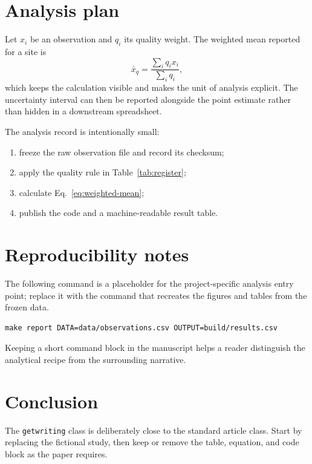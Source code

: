 \documentclass{getwriting}
\begin{document}
\section{Analysis plan}
Let $x_i$ be an observation and $q_i$ its quality weight.  The weighted mean
reported for a site is
\begin{equation}
  \bar{x}_q = \frac{\sum_i q_i x_i}{\sum_i q_i},
  \label{eq:weighted-mean}
\end{equation}
which keeps the calculation visible and makes the unit of analysis explicit.
The uncertainty interval can then be reported alongside the point estimate
rather than hidden in a downstream spreadsheet.

The analysis record is intentionally small:
\begin{enumerate}
  \item freeze the raw observation file and record its checksum;
  \item apply the quality rule in Table~\ref{tab:register};
  \item calculate Eq.~\eqref{eq:weighted-mean};
  \item publish the code and a machine-readable result table.
\end{enumerate}

\section{Reproducibility notes}
The following command is a placeholder for the project-specific analysis
entry point; replace it with the command that recreates the figures and
tables from the frozen data.
\begin{verbatim}
make report DATA=data/observations.csv OUTPUT=build/results.csv
\end{verbatim}
Keeping a short command block in the manuscript helps a reader distinguish
the analytical recipe from the surrounding narrative.

\section{Conclusion}
The \texttt{getwriting} class is deliberately close to the standard article
class.  Start by replacing the fictional study, then keep or remove the
table, equation, and code block as the paper requires.


\end{document}
